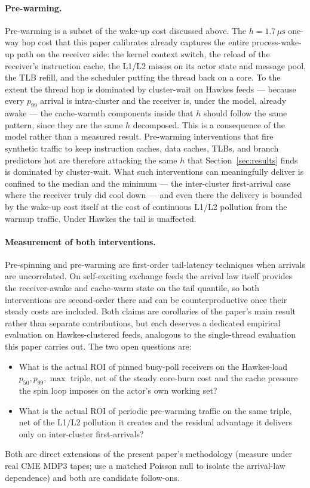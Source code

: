\documentclass[11pt]{article}
\begin{document}
\paragraph{Pre-warming.} Pre-warming is a subset of the wake-up cost discussed above. The $h = 1.7\,\mu\mathrm{s}$ one-way hop cost
that this paper calibrates already captures the entire process-wake-up path on the
receiver side: the kernel context switch, the reload of the receiver's instruction cache,
the L1/L2 misses on its actor state and message pool, the TLB refill, and the scheduler
putting the thread back on a core. To the extent the thread hop is dominated by
cluster-wait on Hawkes feeds --- because every $p_{99}$ arrival is intra-cluster and the
receiver is, under the model, already awake --- the cache-warmth components inside that
$h$ should follow the same pattern, since they are the same $h$ decomposed. This is a
consequence of the model rather than a measured result. Pre-warming interventions that
fire synthetic traffic to keep instruction caches, data caches, TLBs, and branch
predictors hot are therefore attacking the same $h$ that Section~\ref{sec:results} finds
is dominated by cluster-wait. What such interventions can meaningfully deliver is confined
to the median and the minimum --- the inter-cluster first-arrival case where the receiver
truly did cool down --- and even there the delivery is bounded by the wake-up cost itself
at the cost of continuous L1/L2 pollution from the warmup traffic. Under Hawkes the
tail is unaffected.

\paragraph{Measurement of both interventions.} Pre-spinning and pre-warming are first-order
tail-latency techniques when arrivals are uncorrelated. On self-exciting exchange feeds the arrival law itself provides the
receiver-awake and cache-warm state on the tail quantile, so both interventions are
second-order there and can be counterproductive once their steady costs are included. Both claims are
corollaries of the paper's main result rather than separate contributions, but each
deserves a dedicated empirical evaluation on Hawkes-clustered feeds, analogous to the
single-thread evaluation this paper carries out. The two open questions are:
\begin{itemize}
    \item What is the actual ROI of pinned busy-poll receivers on the Hawkes-load $p_{50},
p_{99}, \max$ triple, net of the steady core-burn cost and the cache pressure the spin
loop imposes on the actor's own working set?
    \item What is the actual ROI of periodic pre-warming traffic on the same triple, net
of the L1/L2 pollution it creates and the residual advantage it delivers only on
inter-cluster first-arrivals?
\end{itemize}
Both are direct extensions of the present paper's methodology (measure under real CME MDP3
tapes; use a matched Poisson null to isolate the arrival-law dependence) and both are
candidate follow-ons.
\end{document}
